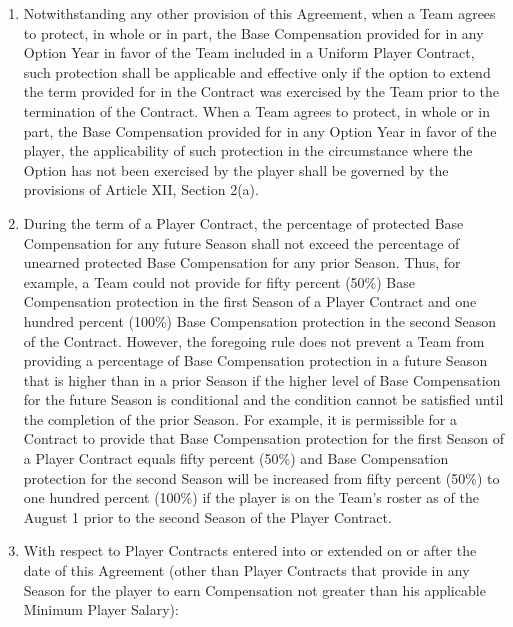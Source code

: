\documentclass[
]{book}
\begin{document}
\begin{enumerate}
\item
  Notwithstanding any other provision of this Agreement, when a Team agrees to protect, in whole or in part, the Base Compensation provided for in any Option Year in favor of the Team included in a Uniform Player Contract, such protection shall be applicable and effective only if the option to extend the term provided for in the Contract was exercised by the Team prior to the termination of the Contract. When a Team agrees to protect, in whole or in part, the Base Compensation provided for in any Option Year in favor of the player, the applicability of such protection in the circumstance where the Option has not been exercised by the player shall be governed by the provisions of Article XII, Section 2(a).
\item
  During the term of a Player Contract, the percentage of protected Base Compensation for any future Season shall not exceed the percentage of unearned protected Base Compensation for any prior Season. Thus, for example, a Team could not provide for fifty percent (50\%) Base Compensation protection in the first Season of a Player Contract and one hundred percent (100\%) Base Compensation protection in the second Season of the Contract. However, the foregoing rule does not prevent a Team from providing a percentage of Base Compensation protection in a future Season that is higher than in a prior Season if the higher level of Base Compensation for the future Season is conditional and the condition cannot be satisfied until the completion of the prior Season. For example, it is permissible for a Contract to provide that Base Compensation protection for the first Season of a Player Contract equals fifty percent (50\%) and Base Compensation protection for the second Season will be increased from fifty percent (50\%) to one hundred percent (100\%) if the player is on the Team's roster as of the August 1 prior to the second
  Season of the Player Contract.
\item
  With respect to Player Contracts entered into or extended on or after the date of this Agreement (other than Player Contracts that provide in any Season for the player to earn Compensation not greater than his applicable Minimum Player Salary):


\end{enumerate}
\end{document}
